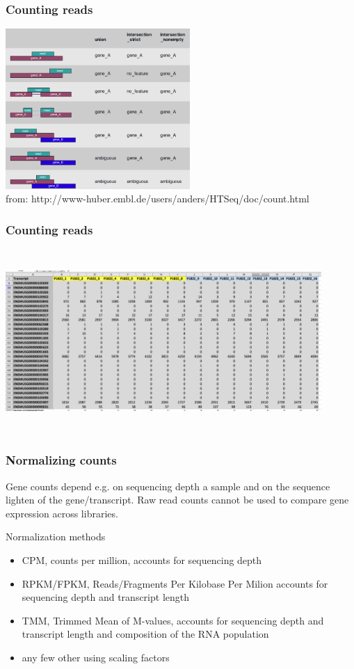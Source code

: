 \documentclass{beamer}\usepackage[]{graphicx}\usepackage[]{color}
\begin{document}
\begin{frame}
\frametitle{Counting reads}
\centering
\includegraphics[width=7cm]{Images/counts_HTseq.png}
  \\{\tiny{from: http://www-huber.embl.de/users/anders/HTSeq/doc/count.html}}
\end{frame}

\begin{frame}
\frametitle{Counting reads}
\begin{center}
\includegraphics[width=12cm, height=7cm]{Images/counts_table.png}
\end{center}
\end{frame}

\begin{frame}
\frametitle{Normalizing counts}
\begin{displayquote}
Gene counts depend e.g. on sequencing depth a sample and on the sequence lighten of the gene/transcript. Raw read counts cannot be used to compare gene expression across libraries. 
\end{displayquote}
\begin{block}{Normalization methods}
\begin{itemize}
\item CPM, counts per million, accounts for sequencing depth
\item RPKM/FPKM, Reads/Fragments Per Kilobase Per Milion accounts for sequencing depth and transcript length
\item TMM, Trimmed Mean of M-values, accounts for sequencing depth and transcript length and composition of the RNA population
\item any few other using scaling factors
\end{itemize}
\end{block}
\end{frame}
\end{document}
